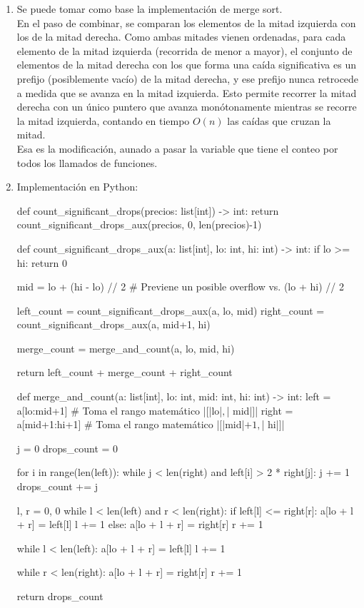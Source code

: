 \begin{enumerate}
  \item Se puede tomar como base la implementación de merge sort. \\

  En el paso de combinar, se comparan los elementos de la mitad izquierda con los de la mitad derecha. Como ambas mitades vienen ordenadas, para cada elemento de la mitad izquierda (recorrida de menor a mayor), el conjunto de elementos de la mitad derecha con los que forma una caída significativa es un prefijo (posiblemente vacío) de la mitad derecha, y ese prefijo nunca retrocede a medida que se avanza en la mitad izquierda. Esto permite recorrer la mitad derecha con un único puntero que avanza monótonamente mientras se recorre la mitad izquierda, contando en tiempo $O(n)$ las caídas que cruzan la mitad. \\

  Esa es la modificación, aunado a pasar la variable que tiene el conteo por todos los llamados de funciones.

  \pagebreak

  \item Implementación en Python:

\begin{pseudocode}
def count_significant_drops(precios: list[int]) -> int:
    return count_significant_drops_aux(precios, 0, len(precios)-1)


def count_significant_drops_aux(a: list[int], lo: int, hi: int) -> int:
    if lo >= hi: return 0

    mid = lo + (hi - lo) // 2  # Previene un posible overflow vs. (lo + hi) // 2

    left_count = count_significant_drops_aux(a, lo, mid)
    right_count = count_significant_drops_aux(a, mid+1, hi)

    merge_count = merge_and_count(a, lo, mid, hi)

    return left_count + merge_count + right_count


def merge_and_count(a: list[int], lo: int, mid: int, hi: int) -> int:
    left = a[lo:mid+1]  # Toma el rango matemático |$[$|lo|$,$| mid|$]$|
    right = a[mid+1:hi+1]  # Toma el rango matemático |$[$|mid|$+1,$| hi|$]$|

    j = 0
    drops_count = 0

    for i in range(len(left)):
        while j < len(right) and left[i] > 2 * right[j]:
            j += 1
        drops_count += j

    l, r = 0, 0
    while l < len(left) and r < len(right):
        if left[l] <= right[r]:
            a[lo + l + r] = left[l]
            l += 1
        else:
            a[lo + l + r] = right[r]
            r += 1

    while l < len(left):
        a[lo + l + r] = left[l]
        l += 1

    while r < len(right):
        a[lo + l + r] = right[r]
        r += 1

    return drops_count
\end{pseudocode}
\end{enumerate}
